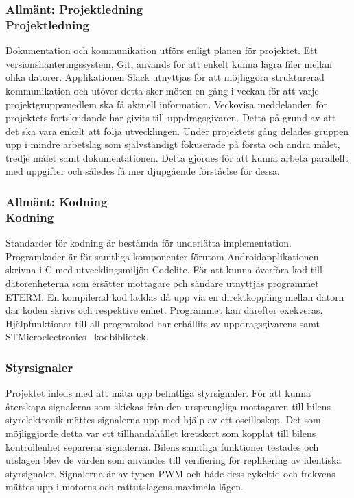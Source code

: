 \documentclass[a4paper]{article}
\begin{document}
\subsubsection{Allmänt: Projektledning \\ Projektledning}
Dokumentation och kommunikation utförs enligt planen för projektet. Ett versionshanteringssystem, Git, används för att enkelt kunna lagra filer mellan olika datorer. Applikationen Slack utnyttjas för att möjliggöra strukturerad kommunikation och utöver detta sker möten en gång i veckan för att varje projektgruppsmedlem ska få aktuell information. Veckovisa meddelanden för projektets fortskridande har givits till uppdragsgivaren. Detta på grund av att det ska vara enkelt att följa utvecklingen. Under projektets gång delades gruppen upp i mindre arbetslag som självständigt fokuserade på första och andra målet, tredje målet samt dokumentationen. Detta gjordes för att kunna arbeta parallellt med uppgifter och således få mer djupgående förståelse för dessa.

\subsubsection{Allmänt: Kodning \\ Kodning}
Standarder för kodning är bestämda för underlätta implementation. Programkoder är för samtliga komponenter förutom Androidapplikationen skrivna i C med utvecklingsmiljön Codelite. För att kunna överföra kod till datorenheterna som ersätter mottagare och sändare utnyttjas programmet ETERM. En kompilerad kod laddas då upp via en direktkoppling mellan datorn där koden skrivs och respektive enhet. Programmet kan därefter exekveras. Hjälpfunktioner till all programkod har erhållits av uppdragsgivarens samt STMicroelectronics~\cite{STM} kodbibliotek. 





\subsubsection{Styrsignaler}
Projektet inleds med att mäta upp befintliga styrsignaler. För att kunna återskapa signalerna som skickas från den ursprungliga mottagaren till bilens styrelektronik mättes signalerna upp med hjälp av ett oscilloskop. Det som möjliggjorde detta var ett tillhandahållet kretskort som kopplat till bilens kontrollenhet separerar signalerna. Bilens samtliga funktioner testades och utslagen blev de värden som användes till verifiering för replikering av identiska styrsignaler. Signalerna är av typen PWM och både dess cykeltid och frekvens mättes upp i motorns och rattutslagens maximala lägen. 
\end{document}
